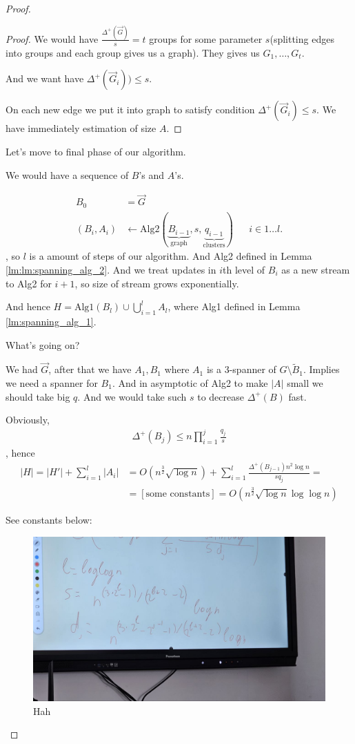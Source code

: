 \begin{proof}
\begin{proof}
	We would have $\frac{\Delta^+(\vec G)}{s} = t$ groups for some parameter $s$(splitting edges into groups and each group gives us a graph).
	They gives us $G_1, \ldots, G_t$.

	And we want have $\Delta^+(\vec G_i)) \leq s$.

	On each new edge we put it into graph to satisfy condition $\Delta^+(\vec G_i) \leq s$.
	We have immediately estimation of size $A$.

	\end{proof}

	Let's move to final phase of our algorithm.

	We would have a sequence of $B$'s and $A$'s.

	\begin{align*}
		B_0 &= \vec G \\
		(B_i, A_i) &\gets \text{Alg2}(\underbrace{B_{i - 1}}_{\text{graph}}, s, \underbrace{q_{i - 1}}_{\text{clusters}}) && i \in 1 \dots l.
	\end{align*}, so $l$ is a amount of steps of our algorithm. And Alg2 defined in Lemma \ref{lm:lm:spanning_alg_2}. And we treat updates in $i$th level of $B_i$ as a new stream to Alg2 for $i + 1$, so size of stream grows exponentially.

	And hence $H = \text{Alg1}(B_l) \cup \bigcup_{i = 1}^{l} A_l$, where Alg1 defined in Lemma \ref{lm:spanning_alg_1}.

	What's going on?

	We had $\vec G$, after that we have $A_1, B_1$ where $A_1$ is a 3-spanner of $G \setminus \tilde B_1$.
	Implies we need a spanner for $B_1$.
	And in asymptotic of Alg2 to make $|A|$ small we should take big $q$. And we would take such $s$ to decrease $\Delta^+(B)$ fast.

	Obviously, 
	\begin{align*}
		\Delta^+(B_j) \leq n \prod_{i = 1}^j \frac{q_j}{s}
	\end{align*}, hence
	\begin{align*}
		|H| = |H'| + \sum_{i = 1}^{l} |A_i| &= O\left(n^{\frac{3}{2}} \sqrt{\log n}\right) + \sum_{i = 1}^{l} \frac{\Delta^+(B_{j - 1}) n^2 \log n}{ s q_j } = \\
											&= [\text{some constants}] = O\left(n^{\frac{3}{2}} \sqrt{\log n} \log \log n\right)
	\end{align*}

	See constants below:

	\begin{figure}[H]
		\centering
		\includegraphics[width=0.5\linewidth]{figures/proof_spanning_contants.jpg}
		\caption{Hah}
		\label{fig:proof_spanning_contants}
	\end{figure}


\end{proof}
